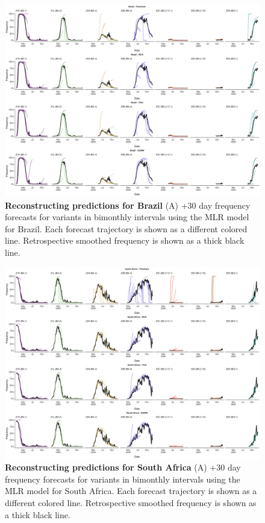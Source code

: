 \documentclass[11pt,oneside,letterpaper]{article}
\begin{document}
\begin{figure}[tb!]
	\centering
	\includegraphics[width=0.9\textwidth=0.01]{supp_figures/supplementary_fig_Brazil.png}
	\caption{
		\textbf{Reconstructing predictions for Brazil}
		(A) +30 day frequency forecasts for variants in bimonthly intervals using the MLR model for Brazil.
		Each forecast trajectory is shown as a different colored line.
		Retrospective smoothed frequency is shown as a thick black line.
	}
	\label{fig:supplementary_fig_Brazil}
\end{figure}


\begin{figure}[tb!]
	\centering
	\includegraphics[width=0.9\textwidth=0.01]{supp_figures/supplementary_fig_South Africa.png}
	\caption{
		\textbf{Reconstructing predictions for South Africa}
		(A) +30 day frequency forecasts for variants in bimonthly intervals using the MLR model for South Africa.
		Each forecast trajectory is shown as a different colored line.
		Retrospective smoothed frequency is shown as a thick black line.
	}
	\label{fig:supplementary_fig_South Africa}
\end{figure}
\end{document}
